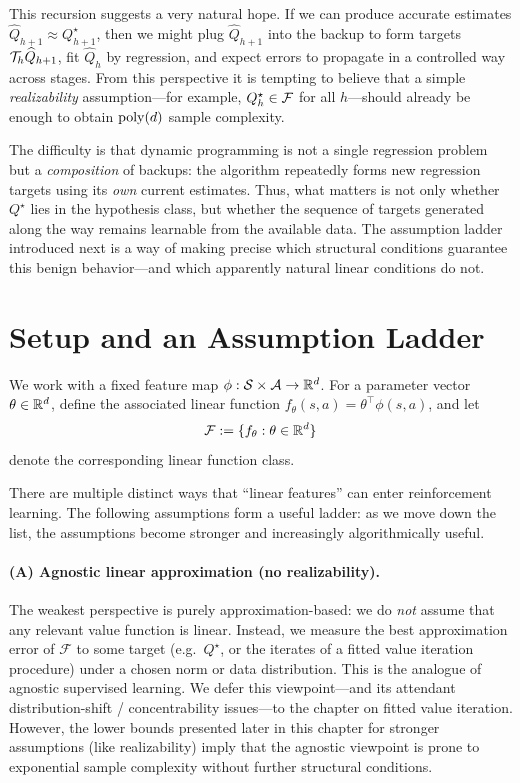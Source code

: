 This recursion suggests a very natural hope.
If we can produce accurate estimates $\widehat Q_{h+1}\approx Q^\star_{h+1}$, then
we might plug $\widehat Q_{h+1}$ into the backup to form targets
$\mathcal{T}_h \widehat Q_{h+1}$, fit $\widehat Q_h$ by regression, and expect errors to
propagate in a controlled way across stages. From this perspective it is tempting
to believe that a simple \emph{realizability} assumption---for example,
$Q_h^\star\in\mathcal{F}$ for all $h$---should already be enough to obtain
$\mathrm{poly}(d)$ sample complexity.

The difficulty is that dynamic programming is not a single regression problem but
a \emph{composition} of backups: the algorithm repeatedly forms new regression
targets using its \emph{own} current estimates. Thus, what matters is not only
whether $Q^\star$ lies in the hypothesis class, but whether the sequence of targets
generated along the way remains learnable from the available data.
The assumption ladder introduced next is a way of making precise which structural
conditions guarantee this benign behavior---and which apparently natural linear
conditions do not.


\section{Setup and an Assumption Ladder}
\label{sec:assumption_ladder}

We work with a fixed feature map $\phi:\mathcal{S}\times\mathcal{A}\to\mathbb{R}^d$.
For a parameter vector $\theta\in\mathbb{R}^d$, define the associated linear function
$f_\theta(s,a)=\theta^\top\phi(s,a)$, and let
\[
\mathcal{F} := \{ f_\theta : \theta\in\mathbb{R}^d \}
\]
denote the corresponding linear function class.

There are multiple distinct ways that ``linear features'' can enter reinforcement learning.
The following assumptions form a useful ladder: as we move down the list, the
assumptions become stronger and increasingly algorithmically useful.

\paragraph{(A) Agnostic linear approximation (no realizability).}
The weakest perspective is purely approximation-based: we do \emph{not} assume that any
relevant value function is linear. Instead, we measure the best approximation error
of $\mathcal{F}$ to some target (e.g.\ $Q^\star$, or the iterates of a fitted value
iteration procedure) under a chosen norm or data distribution.
This is the analogue of agnostic supervised learning.
We defer this viewpoint---and its attendant distribution-shift / concentrability
issues---to the chapter on fitted value iteration.
However, the lower bounds presented later in this chapter for stronger
assumptions (like realizability) imply that the agnostic viewpoint is
prone to exponential sample complexity without further
structural conditions. 

